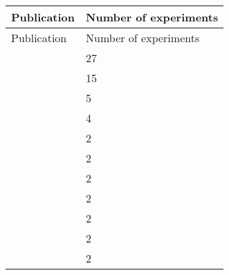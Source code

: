 \startrowcolors
\begin{longtable}{p{6cm}|l}
\hline
\rowcolor{white}
Publication & Number of experiments\\ \hline
\endfirsthead
\hline
\rowcolor{white}
Publication & Number of experiments\\ \hline
\endhead
\hline
\endfoot
\citet{Kapplinger2015MutationDB} & 27 \\
\citet{Tan2005MutationDB} & 15 \\
\citet{Abriel2001MutationDB} & 5 \\
\citet{Cheng2010MutationDB} & 4 \\
\citet{Ye2003MutationDB} & 2 \\
\citet{Watanabe2011bMutationDB} & 2 \\
\citet{Tan2006MutationDB} & 2 \\
\citet{Hu2015MutationDB} & 2 \\
\citet{Cheng2011MutationDB} & 2 \\
\citet{Calloe2011MutationDB} & 2 \\
\citet{An1998MutationDB} & 2 \\
\end{longtable}
